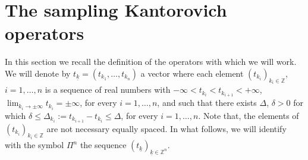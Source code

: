 \documentclass[11pt,a4paper]{article}
\newcommand{\Z}{\mathbb{Z}}
\newcommand{\kk}{\underline{k}}
\begin{document}

\section{The sampling Kantorovich operators}

In this section we recall the definition of the operators with which we will work. We will denote by 
$t_{\underline{k}}=\left(t_{k_1},\dots,t_{k_n}\right)$ a vector where each element $(t_{k_i})_{k_i \in \Z}$, $i=1,\dots,n$ is a sequence of real numbers with $-\infty < t_{k_i}<t_{k_{i+1}}<+\infty$, $\lim_{k_i \to \pm \infty}t_{k_i} = \pm 	\infty$, for every $i=1, \dots, n$, and such that there exists $\Delta$, $\delta>0$ for which $\delta \leq \Delta_{k_i}:= t_{k_{i+1}}-t_{k_{i}} \leq  \Delta$, for every $i=1, \dots , n$.
Note that, the elements of $(t_{k_i})_{k_i \in \Z}$ are not necessary equally spaced.  In what follows, we will identify with the symbol $\Pi^n$ the sequence $(t_{\underline{k}})_{\kk \in \Z^n}$.
\end{document}
